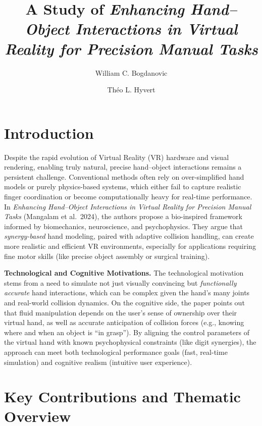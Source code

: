 \documentclass{llncs}
\begin{document}
\title{A Study of \textit{Enhancing Hand--Object Interactions in Virtual Reality for Precision Manual Tasks}}
\author{William C. Bogdanovic \and Théo L. Hyvert}
\maketitle

\section*{Introduction}
Despite the rapid evolution of Virtual Reality (VR) hardware and visual rendering, enabling truly natural, precise hand--object interactions remains a persistent challenge. Conventional methods often rely on over-simplified hand models or purely physics-based systems, which either fail to capture realistic finger coordination or become computationally heavy for real-time performance. In \emph{Enhancing Hand--Object Interactions in Virtual Reality for Precision Manual Tasks} (Mangalam et al.\ 2024), the authors propose a bio-inspired framework informed by biomechanics, neuroscience, and psychophysics. They argue that \emph{synergy-based} hand modeling, paired with adaptive collision handling, can create more realistic and efficient VR environments, especially for applications requiring fine motor skills (like precise object assembly or surgical training).

\vspace{1em}
\noindent
\textbf{Technological and Cognitive Motivations.} The technological motivation stems from a need to simulate not just visually convincing but \emph{functionally accurate} hand interactions, which can be complex given the hand's many joints and real-world collision dynamics. On the cognitive side, the paper points out that fluid manipulation depends on the user's sense of ownership over their virtual hand, as well as accurate anticipation of collision forces (e.g., knowing where and when an object is ``in grasp''). By aligning the control parameters of the virtual hand with known psychophysical constraints (like digit synergies), the approach can meet both technological performance goals (fast, real-time simulation) and cognitive realism (intuitive user experience).

\section*{Key Contributions and Thematic Overview}
\end{document}
